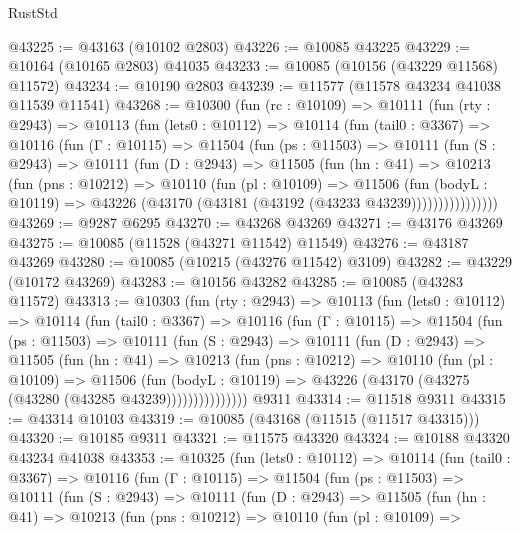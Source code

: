 \begin{lexlean}{RustStd}
\begin{coremodule}
@43225 := @43163 (@10102 @2803)
@43226 := @10085 @43225
@43229 := @10164 (@10165 @2803) @41035
@43233 := @10085 (@10156 (@43229 @11568) @11572)
@43234 := @10190 @2803
@43239 := @11577 (@11578 @43234 @41038 @11539 @11541)
@43268 := @10300
    (fun (rc : @10109) =>
    @10111
      (fun (rty : @2943) =>
      @10113
        (fun (lets0 : @10112) =>
        @10114
          (fun (tail0 : @3367) =>
          @10116
            (fun (Γ : @10115) =>
            @11504
              (fun (ps : @11503) =>
              @10111
                (fun (S : @2943) =>
                @10111
                  (fun (D : @2943) =>
                  @11505
                    (fun (hn : @41) =>
                    @10213
                      (fun (pns : @10212) =>
                      @10110
                        (fun (pl : @10109) =>
                        @11506
                          (fun (bodyL : @10119) =>
                          @43226 (@43170 (@43181 (@43192 (@43233 @43239))))))))))))))))
@43269 := @9287 @6295
@43270 := @43268 @43269
@43271 := @43176 @43269
@43275 := @10085 (@11528 (@43271 @11542) @11549)
@43276 := @43187 @43269
@43280 := @10085 (@10215 (@43276 @11542) @3109)
@43282 := @43229 (@10172 @43269)
@43283 := @10156 @43282
@43285 := @10085 (@43283 @11572)
@43313 := @10303
    (fun (rty : @2943) =>
    @10113
      (fun (lets0 : @10112) =>
      @10114
        (fun (tail0 : @3367) =>
        @10116
          (fun (Γ : @10115) =>
          @11504
            (fun (ps : @11503) =>
            @10111
              (fun (S : @2943) =>
              @10111
                (fun (D : @2943) =>
                @11505
                  (fun (hn : @41) =>
                  @10213
                    (fun (pns : @10212) =>
                    @10110
                      (fun (pl : @10109) =>
                      @11506
                        (fun (bodyL : @10119) =>
                        @43226 (@43170 (@43275 (@43280 (@43285 @43239)))))))))))))))
    @9311
@43314 := @11518 @9311
@43315 := @43314 @10103
@43319 := @10085 (@43168 (@11515 (@11517 @43315)))
@43320 := @10185 @9311
@43321 := @11575 @43320
@43324 := @10188 @43320 @43234 @41038
@43353 := @10325
    (fun (lets0 : @10112) =>
    @10114
      (fun (tail0 : @3367) =>
      @10116
        (fun (Γ : @10115) =>
        @11504
          (fun (ps : @11503) =>
          @10111
            (fun (S : @2943) =>
            @10111
              (fun (D : @2943) =>
              @11505
                (fun (hn : @41) =>
                @10213
                  (fun (pns : @10212) =>
                  @10110
                    (fun (pl : @10109) =>

\end{coremodule}
\end{lexlean}

